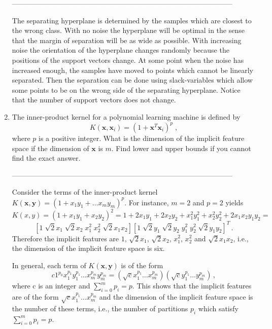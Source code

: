 \documentclass[10pt]{article}
\renewcommand{\vec}[1]{\mathbf{#1}}
\newcommand{\x}{\vec{x}}
\newcommand{\y}{\vec{y}}
\begin{document}
\begin{enumerate}
---------------------------------------------------------------------------------------------

The separating hyperplane is determined by the samples which are
  closest to the wrong class.  With no noise the hyperplane will be
  optimal in the sense that the margin of separation will be as wide
  as possible.  With increasing noise the orientation of the
  hyperplane changes randomly because the positions of the support
  vectors change.  At some point when the noise has increased enough,
  the samples have moved to points which cannot be linearly separated.
  Then the separation can be done using slack-variables which allow
  some points to be on the wrong side of the separating hyperplane.
  Notice that the number of support vectors does not change.

\vspace{2mm}

\vspace{2cm}
\item The inner-product kernel for a polynomial learning machine is
  defined by
  \begin{displaymath}
    K(\x,\x_i) = (1 + \x^T \x_i)^p \; ,
  \end{displaymath}
  where $p$ is a positive integer.  What is the dimension of the
  implicit feature space if the dimension of $\x$ is $m$.  Find lower
  and upper bounds if you cannot find the exact answer.

---------------------------------------------------------------------------------------------

Consider the terms of the inner-product kernel $K(\x, \y) =
  (1 + x_1 y_1 + \ldots x_m y_m)^p$.  For instance, $m=2$ and $p=2$
  yields $$K(x, y) = (1 + x_1y_1 + x_2y_2)^2 = 1 + 2x_1y_1 + 2x_2y_2 +
  x_1^2y_1^2 + x_2^2y_2^2 + 2x_1x_2y_1y_2 = $$ $$[1 \; \sqrt{2}x_1 \;
  \sqrt{2}x_2 \; x_1^2 \; x_2^2 \; \sqrt{2}x_1 x_2] [1 \; \sqrt{2}y_1
  \; \sqrt{2}y_2 \; y_1^2 \; y_2^2 \; \sqrt{2}y_1 y_2]^T \, .$$
  Therefore the implicit features are $1$, $\sqrt{2}x_1$,
  $\sqrt{2}x_2$, $x_1^2$, $x_2^2$ and $\sqrt{2}x_1 x_2$, i.e., the
  dimension of the implicit feature space is six.

  In general, each term of $K(\x, \y)$ is of the form $$c 1^{p_0}
  x_1^{p_1} y_1^{p_1} \ldots x_m^{p_m} y_m^{p_m} = (\sqrt{c} x_1^{p_1}
  \ldots x_m^{p_m})(\sqrt{c} y_1^{p_1} \ldots y_m^{p_m}) \, ,$$where c
  is an integer and $\sum_{i=0}^m p_i = p$.  This shows that the
  implicit features are of the form $\sqrt{c} x_1^{p_1} \ldots
  x_m^{p_m}$ and the dimension of the implicit feature space is the
  number of these terms, i.e., the number of partitions $p_i$ which
  satisfy $\sum_{i=0}^m p_i = p$.


\end{enumerate}
\end{document}

